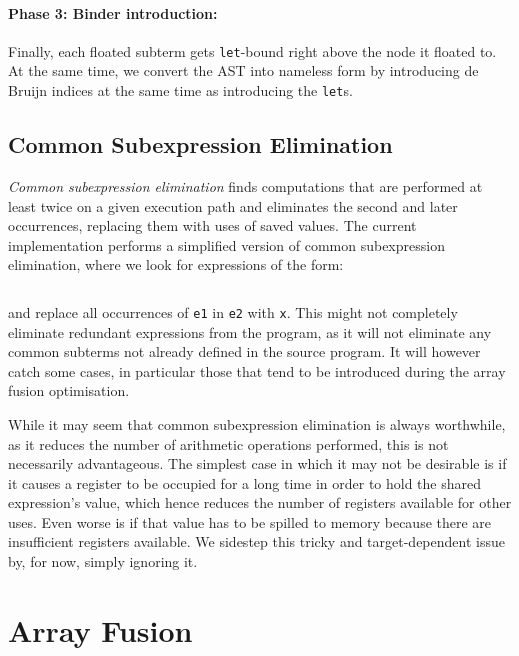 \paragraph{Phase 3: Binder introduction:}

Finally, each floated subterm gets \texttt{let}-bound right above the node it
floated to. At the same time, we convert the AST into nameless  form by introducing de Bruijn indices at the same time as introducing
the \texttt{let}s.\\


\subsection{Common Subexpression Elimination}
\label{sec:cse}

\emph{Common subexpression elimination} finds computations that are performed at
least twice on a given execution path and eliminates the second and later
occurrences, replacing them with uses of saved values. The current
implementation performs a simplified version of common subexpression
elimination, where we look for expressions of the form:
%
\begin{lstlisting}[style=Haskell,numbers=none]
%\bf$\langle$ common subexpression elimination $\rangle$% let x = e1 in [x/e1]e2
\end{lstlisting}
%
and replace all occurrences of \texttt{e1} in \texttt{e2} with \texttt{x}. This
might not completely eliminate redundant expressions from the program, as it will
not eliminate any common subterms not already defined in the source program. It
will however catch some cases, in particular those that tend to be introduced
during the array fusion optimisation.

While it may seem that common subexpression elimination is always worthwhile, as
it reduces the number of arithmetic operations performed, this is not
necessarily advantageous. The simplest case in which it may not be desirable is
if it causes a register to be occupied for a long time in order to hold the
shared expression's value, which hence reduces the number of registers available
for other uses. Even worse is if that value has to be spilled to memory because
there are insufficient registers available. We sidestep this tricky and
target-dependent issue by, for now, simply ignoring it.



\section{Array Fusion}
\label{sec:fusion}

